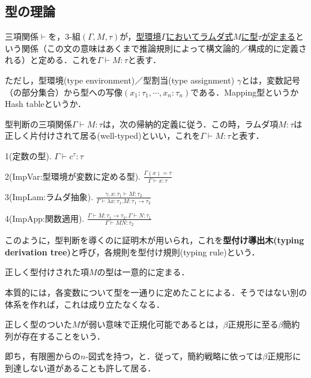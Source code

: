\documentclass[uplatex, 12pt, dvipdfmx]{jsreport}
\begin{document}
\subsection{型の理論}

\begin{definition}
    三項関係$\vdash$を，3-組$(\Gamma,M,\tau)$が，\underline{型環境$\Gamma$においてラムダ式$M$に型$\tau$が定まる}という関係（この文の意味はあくまで推論規則によって構文論的／構成的に定義される）と定める．これを$\Gamma\vdash M:\tau$と表す．

    ただし，型環境(type environment)／型割当(type assignment) $\gamma$とは，変数記号（の部分集合）から型への写像$(x_1:\tau_1,\cdots,x_n:\tau_n)$である．Mapping型というかHash tableというか．
\end{definition}
\begin{definition}
    型判断の三項関係$\Gamma\vdash M:\tau$は，次の帰納的定義に従う．この時，ラムダ項$M:\tau$は正しく片付けされて居る(well-typed)といい，これを$\Gamma\vdash M:\tau$と表す．

    1(定数の型). $\Gamma\vdash c^\tau:\tau$

    2(ImpVar:型環境が変数に定める型). $\frac{\Gamma(x)=\tau}{\Gamma\vdash x:\tau}$

    3(ImpLam:ラムダ抽象). $\frac{\gamma,x:\tau_1\vdash M:\tau_2}{\Gamma\vdash\lambda x:\tau_1.M:\tau_1\to\tau_2}$

    4(ImpApp:関数適用). $\frac{\Gamma\vdash M:\tau_1\to\tau_2, \Gamma\vdash N:\tau_1}{\Gamma\vdash MN:\tau_2}$
\end{definition}
\begin{remark}
    このように，型判断を導くのに証明木が用いられ，これを\textbf{型付け導出木(typing derivation tree)}と呼び，各規則を型付け規則(typing rule)という．
\end{remark}

\begin{proposition}[型付けの一意性]
    正しく型付けされた項$M$の型は一意的に定まる．
\end{proposition}
\begin{remark}
    本質的には，各変数について型を一通りに定めたことによる．そうではない別の体系を作れば，これは成り立たなくなる．
\end{remark}

\begin{definition}
    正しく型のついた$M$が弱い意味で正規化可能であるとは，$\beta$正規形に至る$\beta$簡約列が存在することをいう．
\end{definition}
\begin{remark}
    即ち，有限圏からの$n$-図式を持つ，と．従って，簡約戦略に依っては$\beta$正規形に到達しない道があることも許して居る．
\end{remark}
\end{document}
